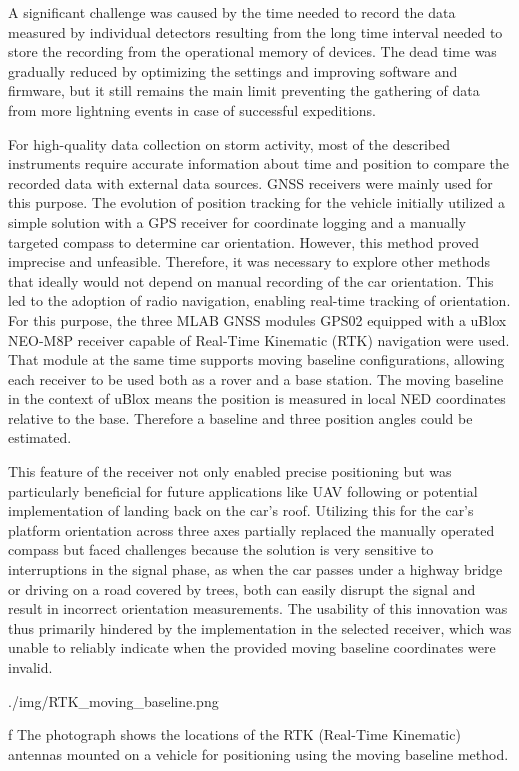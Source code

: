 A significant challenge was caused by the time needed to record the data measured by individual detectors resulting from the long time interval needed to store the recording from the operational memory of devices. The dead time was gradually reduced by optimizing the settings and improving software and firmware, but it still remains the main limit preventing the gathering of data from more lightning events in case of successful expeditions.

For high-quality data collection on storm activity, most of the described instruments require accurate information about time and position to compare the recorded data with external data sources.
GNSS receivers were mainly used for this purpose. The evolution of position tracking for the vehicle initially utilized a simple solution with a GPS receiver for coordinate logging and a manually targeted compass to determine car orientation. However, this method proved imprecise and unfeasible.
Therefore, it was necessary to explore other methods that ideally would not depend on manual recording of the car orientation. This led to the adoption of radio navigation, enabling real-time tracking of orientation. For this purpose, the three MLAB GNSS modules GPS02 equipped with a uBlox NEO-M8P receiver capable of Real-Time Kinematic (RTK) navigation were used. That module at the same time supports moving baseline configurations, allowing each receiver to be used both as a rover and a base station. The moving baseline in the context of uBlox means the  position is measured in local NED coordinates relative to the base. Therefore a baseline and three position angles could be estimated.

This feature of the receiver not only enabled precise positioning but was particularly beneficial for future applications like UAV following or potential implementation of landing back on the car's roof. Utilizing this for the car's platform orientation across three axes partially replaced the manually operated compass but faced challenges because the solution is very sensitive to interruptions in the signal phase, as when the car passes under a highway bridge or driving on a road covered by trees, both can easily disrupt the signal and result in incorrect orientation measurements. The usability of this innovation was thus primarily hindered by the implementation in the selected receiver, which was unable to reliably indicate when the provided moving baseline coordinates were invalid.

\medskip
{}
\picw=15cm \cinspic ./img/RTK_moving_baseline.png
\caption/f  The photograph shows the locations of the RTK (Real-Time Kinematic) antennas mounted on a vehicle for positioning using the moving baseline method.
\medskip

